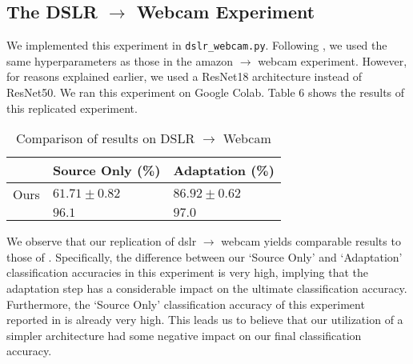 \documentclass[14pt]{extarticle}
\begin{document}
		\subsection{The DSLR $\rightarrow$ Webcam Experiment}
		We implemented this experiment in \texttt{dslr\_webcam.py}. Following \cite{adda}, we used the same hyperparameters as those in the amazon $\rightarrow$ webcam experiment. However, for reasons explained earlier, we used a ResNet18 architecture instead of ResNet50. We ran this experiment on Google Colab. Table 6 shows the results of this replicated experiment.
		\begin{table}[H]
			\centering
			\begin{tabular}{|P{40mm}|P{40mm}|P{40mm}|}
				\hline
				 & Source Only (\%) & Adaptation (\%)\\
				\hline
				Ours & $61.71 \pm 0.82$ & $86.92 \pm 0.62$\\
				\hline
				\cite{adda} & $96.1$ & $97.0$\\
				\hline
			\end{tabular}
			\caption{Comparison of results on DSLR $\rightarrow$ Webcam}
		\end{table}
		We observe that our replication of dslr $\rightarrow$ webcam yields comparable results to those of \cite{adda}. Specifically, the difference between our `Source Only' and `Adaptation' classification accuracies in this experiment is very high, implying that the adaptation step has a considerable impact on the ultimate classification accuracy. Furthermore, the `Source Only' classification accuracy of this experiment reported in \cite{adda} is already very high. This leads us to believe that our utilization of a simpler architecture had some negative impact on our final classification accuracy.
\end{document}
